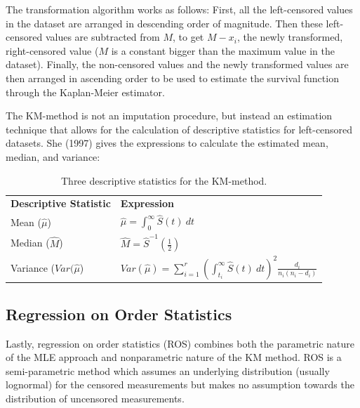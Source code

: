 \documentclass[12pt, twoside]{amherstthesis}
\begin{document}
The transformation algorithm works as follows: First, all the left-censored values in the dataset are arranged in descending order of magnitude. Then these left-censored values are subtracted from \(M\), to get \(M-x_i\), the newly transformed, right-censored value (\(M\) is a constant bigger than the maximum value in the dataset). Finally, the non-censored values and the newly transformed values are then arranged in ascending order to be used to estimate the survival function through the Kaplan-Meier estimator.

The KM-method is not an imputation procedure, but instead an estimation technique that allows for the calculation of descriptive statistics for left-censored datasets. She (1997) gives the expressions to calculate the estimated mean, median, and variance:
\begin{table}[h]
\begin{center}
\begin{tabular}{ll}
\textbf{Descriptive Statistic} & \textbf{Expression}                                                                                              \\
Mean ($\hat{\mu}$)             & $\hat{\mu} = \displaystyle \int_{0}^{\infty} \hat{S}(t) \ dt$                                                    \\
Median ($\hat{M}$)             & $\hat{M} = \displaystyle \hat{S}^{-1} \left (\frac{1}{2} \right)$                                                              \\
Variance ($Var(\hat{\mu}$)     & $Var(\hat{\mu}) = \displaystyle \sum_{i=1}^{r} \left( \int_{t_i}^{\infty}\hat{S}(t) \ dt \right)^2 \frac{d_i}{n_i(n_i - d_i)}$
\end{tabular}
\caption{\label{tab:KMDesc}Three descriptive statistics for the KM-method.}
\end{center}
\end{table}
\hypertarget{ROS}{%
\subsection{Regression on Order Statistics}\label{ROS}}

Lastly, regression on order statistics (ROS) combines both the parametric nature of the MLE approach and nonparametric nature of the KM method. ROS is a semi-parametric method which assumes an underlying distribution (usually lognormal) for the censored measurements but makes no assumption towards the distribution of uncensored measurements.
\end{document}
